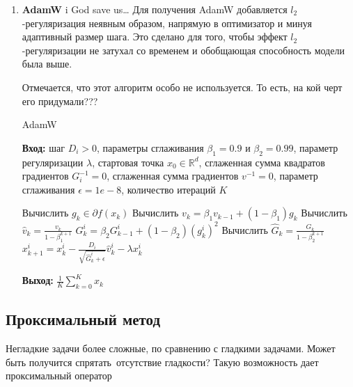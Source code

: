 \begin{enumerate}
    \item \textbf{AdamW} i God save us\dots
          Для получения AdamW добавляется $l_2$-регуляризация неявным образом,
          напрямую в оптимизатор и минуя адаптивный размер шага.
          Это сделано для того, чтобы эффект $l_2$-регуляризации не затухал со
          временем и обобщающая способность модели была выше.

          \begin{note}
              Отмечается, что этот алгоритм особо не используется. То есть, на кой черт его придумали???
          \end{note}

          \begin{algorithm}[H]
              \caption{AdamW}
              \textbf{Вход:} шаг $D_i > 0$, параметры сглаживания $\beta_1 = 0.9$ и $\beta_2 = 0.99$, параметр регуляризации $\lambda$, стартовая точка $x_0 \in \mathbb{R}^d$, сглаженная сумма квадратов градиентов $G_i^{-1} = 0$, сглаженная сумма градиентов $v^{-1} = 0$, параметр сглаживания $\epsilon = 1e-8$, количество итераций $K$
              \begin{algorithmic}[1]
                  \State Вычислить $g_k \in \partial f(x_k)$
                  \State Вычислить $v_k = \beta_1 v_{k-1} + (1 - \beta_1) g_k$
                  \State Вычислить $\hat{v}_k = \frac{v_k}{1 - \beta_1^{k+1}}$
                  \State $G_k^i = \beta_2 G_{k-1}^i + (1 - \beta_2) (g_k^i)^2$
                  \EndFor
                  \State Вычислить $\hat{G}_k = \frac{G_k}{1 - \beta_2^{k+1}}$
                  \State $x_{k+1}^i = x_k^i - \frac{D_i}{\sqrt{\hat{G}_k^i + \epsilon}} \hat{v}_k^i - \lambda x_k^i$
                  \EndFor
                  \EndFor
              \end{algorithmic}
              \textbf{Выход:} $\frac{1}{K} \sum_{k=0}^K x_k$
          \end{algorithm}
\end{enumerate}

\subsection*{Проксимальный метод}

Негладкие задачи \guillemetleft более сложные\guillemetright, по сравнению с гладкими задачами.
Может быть получится \guillemetleft спрятать\guillemetright \, отсутствие гладкости?
Такую возможность дает проксимальный оператор

